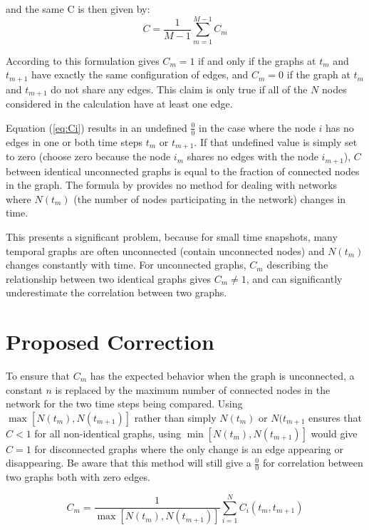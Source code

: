 \documentclass[12pt]{article}
\begin{document}
and the same C is then given by:
\begin{equation}
C = \frac{1}{M-1}\sum_{m=1}^{M-1} C_m
\label{eq:C1b}
\end{equation}

According to \cite{1} this formulation gives \(C_m=1\) if and only if the graphs at \(t_m\) and \(t_{m+1}\)  have exactly the same configuration of edges, and \(C_m = 0\) if the graph at \(t_m\) and \(t_{m+1}\) do not share any edges.  This claim is only true if all of the \(N\) nodes considered in the calculation have at least one edge. 

Equation (\ref{eq:Ci}) results in an undefined \(\frac{0}{0}\) in the case where the node \(i\) has no edges in one or both time steps \(t_m\) or \(t_{m+1}\). If that undefined value is simply set to zero (choose zero because the node \(i_m\) shares no edges with the node \(i_{m+1}\)), \(C\) between identical unconnected graphs is equal to the fraction of connected nodes in the graph. The formula by \cite{1} provides no method for dealing with networks where \(N(t_m)\) (the number of nodes participating in the network) changes in time.

This presents a significant problem, because for small time snapshots, many temporal graphs are often unconnected (contain unconnected nodes) \cite{1} and \(N(t_m)\) changes constantly with time. For unconnected graphs, \(C_m\) describing the relationship between two identical graphs gives \(C_m \neq 1\), and can significantly underestimate the correlation between two graphs.

\section{Proposed Correction}
To ensure that \(C_m\) has the expected behavior when the graph is unconnected, a constant \(n\) is replaced by the maximum number of connected nodes in the network for the two time steps being compared. Using \(\max [N(t_m),N(t_{m+1})]\) rather than simply \(N(t_m)\) or \(N(t_{m+1}\) ensures that \(C < 1\) for all non-identical graphs, using \(\min [N(t_m),N(t_{m+1})]\) would give \(C = 1\) for disconnected graphs where the only change is an edge appearing or disappearing. Be aware that this method will still give a \(\frac{0}{0}\) for correlation between two graphs both with zero edges.

\begin{equation}
C_m = \frac{1}{\max [N(t_m),N(t_{m+1})]} \sum_{i = 1}^{N} C_i(t_m,t_{m+1})
\label{eq:Cm2}
\end{equation}
\end{document}
